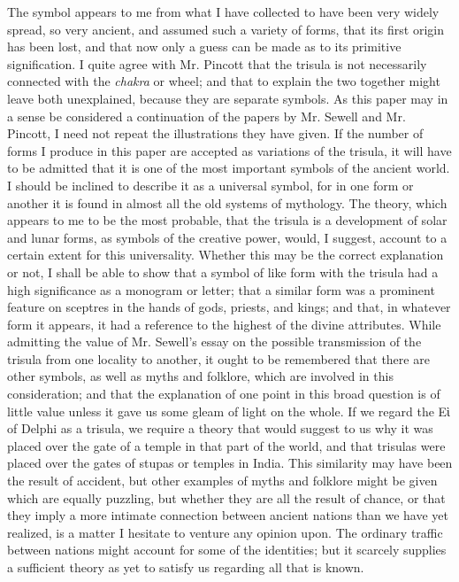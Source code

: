 \documentclass[a4paper, 11pt, oneside, english, landscape, twocolumn]{article}
\begin{document}
The symbol appears to me from what I have collected to have been very widely spread, so very ancient, and assumed such a variety of forms, that its first origin has been lost, and that now only a guess can be made as to its primitive signification. I quite agree with Mr. Pincott that the trisula is not necessarily connected with the \emph{chakra} or wheel; and that to explain the two together might leave both unexplained, because they are separate symbols. As this paper may in a sense be considered a continuation of the papers by Mr. Sewell and Mr. Pincott, I need not repeat the illustrations they have given. If the number of forms I produce in this paper are accepted as variations of the trisula, it will have to be admitted that it is one of the most important symbols of the ancient world. I should be inclined to describe it as a universal symbol, for in one form or another it is found in almost all the old systems of mythology. The theory, which appears to me to be the most probable, that the trisula is a development of solar and lunar forms, as symbols of the creative power, would, I suggest, account to a certain extent for this universality. Whether this may be the correct explanation or not, I shall be able to show that a symbol of like form with the trisula had a high significance as a monogram or letter; that a similar form was a prominent feature on sceptres in the hands of gods, priests, and kings; and that, in whatever form it appears, it had a reference to the highest of the divine attributes. While admitting the value of Mr. Sewell's essay on the possible transmission of the trisula from one locality to another, it ought to be remembered that there are other symbols, as well as myths and folklore, which are involved in this consideration; and that the explanation of one point in this broad question is of little value unless it gave us some gleam of light on the whole. If we regard the Εὶ of Delphi as a trisula, we require a theory that would suggest to us why it was placed over the gate of a temple in that part of the world, and that trisulas were placed over the gates of stupas or temples in India. This similarity may have been the result of accident, but other examples of myths and folklore might be given which are equally puzzling, but whether they are all the result of chance, or that they imply a more intimate connection between ancient nations than we have yet realized, is a matter I hesitate to venture any opinion upon. The ordinary traffic between nations might account for some of the identities; but it scarcely supplies a sufficient theory as yet to satisfy us regarding all that is known.
\end{document}
